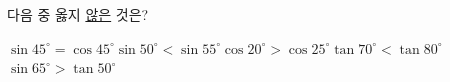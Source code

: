 다음 중 옳지 \underline{않은} 것은?
\begin{choicesii}{$\sin 45^\circ=\cos 45^\circ$}{$\sin 50^\circ<\sin 55^\circ$}{$\cos 20^\circ>\cos 25^\circ$}{$\tan 70^\circ<\tan 80^\circ$}{$\sin 65^\circ>\tan 50^\circ$}\end{choicesii}

